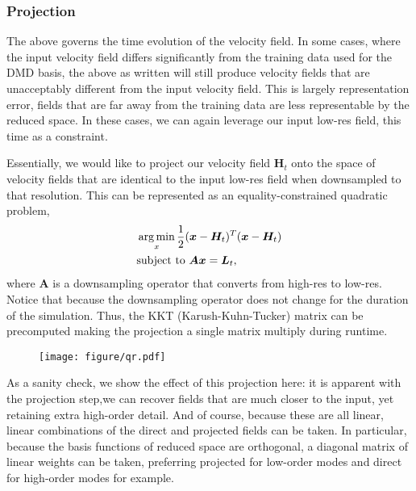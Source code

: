 \subsubsection{Projection}

The above governs the time evolution of the velocity field. In some cases, where the input velocity field differs significantly from the training data used for the DMD basis, the above as written will still produce velocity fields that are unacceptably different from the input velocity field. This is largely representation error, fields that are far away from the training data are less representable by the reduced space. In these cases, we can again leverage our input low-res field, this time as a constraint. 

Essentially, we would like to project our velocity field $\bm{H}_t$ onto the space of velocity fields that are identical to the input low-res field when downsampled to that resolution. This can be represented as an equality-constrained quadratic problem,
\begin{align}
    &\operatorname*{arg\,min}_x \frac{1}{2}(\bm{x}-\bm{H}_t)^T(\bm{x}-\bm{H}_t) \\
    &\text{subject to } \bm{Ax} = \bm{L}_t,
\end{align}
where $\bm{A}$ is a downsampling operator that converts from high-res to low-res. 
Notice that because the downsampling operator does not change for the duration of the simulation. Thus, the KKT (Karush-Kuhn-Tucker) matrix can be precomputed making the projection a single matrix multiply during runtime.

\begin{wrapfigure}{r}{0.5\columnwidth}
    \vspace{-2pt}
    \texttt{[image: figure/qr.pdf]}
    \hspace{5pt}
    \label{fig:qp_project}
\end{wrapfigure}

As a sanity check, we show the effect of this projection here: it is apparent with the projection step,we can recover fields that are much closer to the input, yet retaining extra high-order detail. And of course, because these are all linear, linear combinations of the direct and projected fields can be taken. In particular, because the basis functions of reduced space are orthogonal, a diagonal matrix of linear weights can be taken, preferring projected for low-order modes and direct for high-order modes for example.

